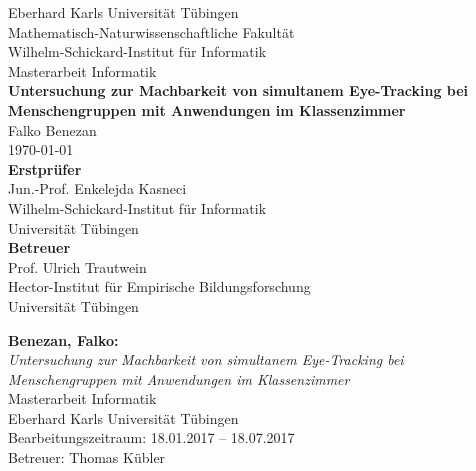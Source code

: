 \documentclass[twoside,12pt,a4paper]{scrreprt}
\begin{document}
\begin{titlepage}
	\begin{center}
		\LARGE Eberhard Karls Universität Tübingen\\
		\large Mathematisch-Naturwissenschaftliche Fakultät \\
		Wilhelm-Schickard-Institut für Informatik\\
		[3cm]
		\huge Masterarbeit Informatik\\
		[2cm]
		\Large\textbf{Untersuchung zur Machbarkeit von simultanem Eye-Tracking bei Menschengruppen mit Anwendungen im Klassenzimmer}\\
		[1.5cm]
		\large Falko Benezan\\
		[0.5cm]
		\today\\
		\vfill
		\small\textbf{Erstprüfer}\\[0.3cm]
		\large Jun.-Prof. Enkelejda Kasneci\\
		\footnotesize Wilhelm-Schickard-Institut für Informatik\\Universität Tübingen\\
		[1cm]
		\small\textbf{Betreuer}\\[0.3cm]
		\large Prof. Ulrich Trautwein\\
		\footnotesize Hector-Institut für Empirische Bildungsforschung\\ Universität Tübingen
	\end{center}
\end{titlepage}

\thispagestyle{empty}
\vspace*{\fill}
\textbf{Benezan, Falko:}\\
\emph{Untersuchung zur Machbarkeit von simultanem Eye-Tracking bei Menschengruppen mit Anwendungen im Klassenzimmer}\\
Masterarbeit Informatik\\
Eberhard Karls Universität Tübingen\\
Bearbeitungszeitraum: 18.01.2017 -- 18.07.2017\\
Betreuer: Thomas Kübler
\newpage


\newpage

\tableofcontents
\cleardoublepage

\end{document}
